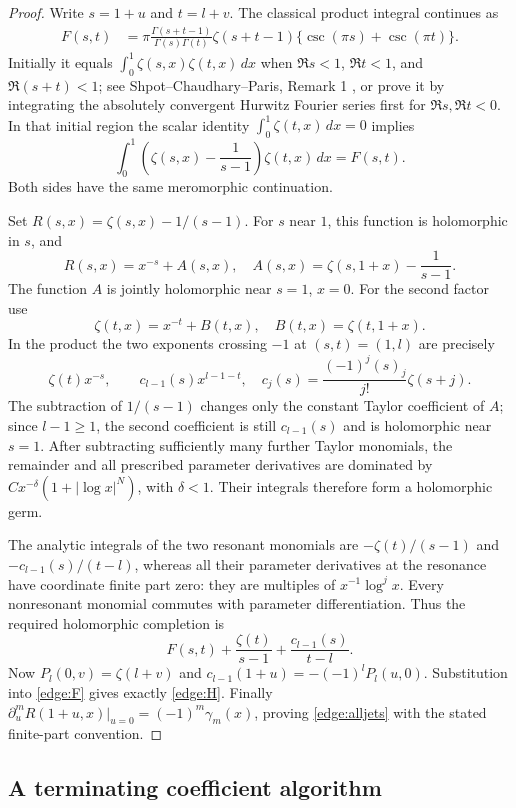 \begin{proof}
Write $s=1+u$ and $t=l+v$.  The classical product integral continues as
\begin{align}
 F(s,t)&=\pi\frac{\Gamma(s+t-1)}{\Gamma(s)\Gamma(t)}
              \zeta(s+t-1)\{\csc(\pi s)+\csc(\pi t)\}.
 \label{edge:F}
\end{align}
Initially it equals $\int_0^1\zeta(s,x)\zeta(t,x)\,dx$ when
$\Re s<1$, $\Re t<1$, and $\Re(s+t)<1$; see
Shpot--Chaudhary--Paris, Remark 1 \cite{ShpotParis}, or prove it by integrating the
absolutely convergent Hurwitz Fourier series first for
$\Re s,\Re t<0$.  In that initial region the scalar identity
$\int_0^1\zeta(t,x)\,dx=0$ implies
\[
 \int_0^1\left(\zeta(s,x)-\frac1{s-1}\right)\zeta(t,x)\,dx
 =F(s,t).
\]
Both sides have the same meromorphic continuation.

Set $R(s,x)=\zeta(s,x)-1/(s-1)$.  For $s$ near $1$, this function
is holomorphic in $s$, and
\[
 R(s,x)=x^{-s}+A(s,x),\quad
 A(s,x)=\zeta(s,1+x)-\frac1{s-1}.
\]
The function $A$ is jointly holomorphic near $s=1$, $x=0$.
For the second factor use
\[
 \zeta(t,x)=x^{-t}+B(t,x),\quad B(t,x)=\zeta(t,1+x).
\]
In the product the two exponents crossing $-1$ at $(s,t)=(1,l)$ are
precisely
\[
 \zeta(t)x^{-s},\qquad
 c_{l-1}(s)x^{l-1-t},\quad
 c_j(s)=\frac{(-1)^j(s)_j}{j!}\zeta(s+j).
\]
The subtraction of $1/(s-1)$ changes only the constant Taylor
coefficient of $A$; since $l-1\ge1$, the second coefficient is still
$c_{l-1}(s)$ and is holomorphic near $s=1$.
After subtracting sufficiently many further Taylor monomials, the
remainder and all prescribed parameter derivatives are dominated by
$Cx^{-\delta}(1+|\log x|^N)$, with $\delta<1$.
Their integrals therefore form a holomorphic germ.

The analytic integrals of the two resonant monomials are
$-\zeta(t)/(s-1)$ and $-c_{l-1}(s)/(t-l)$, whereas all their
parameter derivatives at the resonance have coordinate finite part
zero: they are multiples of $x^{-1}\log^j x$.
Every nonresonant monomial commutes with parameter differentiation.
Thus the required holomorphic completion is
\[
 F(s,t)+\frac{\zeta(t)}{s-1}+
                         \frac{c_{l-1}(s)}{t-l}.
\]
Now $P_l(0,v)=\zeta(l+v)$ and
$c_{l-1}(1+u)=-(-1)^lP_l(u,0)$.
Substitution into \eqref{edge:F} gives exactly \eqref{edge:H}.
Finally $\partial_u^mR(1+u,x)|_{u=0}=(-1)^m\gamma_m(x)$,
proving \eqref{edge:alljets} with the stated finite-part convention.
\end{proof}

\subsection{A terminating coefficient algorithm}


